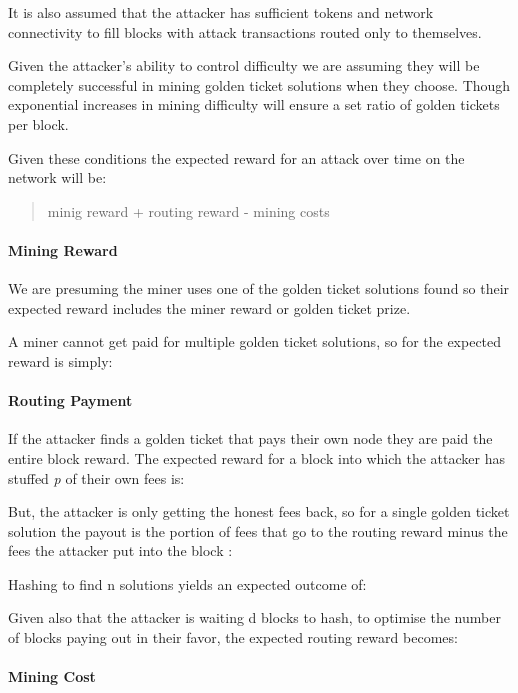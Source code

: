 \documentclass[
]{article}
\begin{document}
It is also assumed that the attacker has sufficient tokens and network
connectivity to fill blocks with attack transactions routed only to
themselves.

Given the attacker's ability to control difficulty we are assuming they
will be completely successful in mining golden ticket solutions when
they choose. Though exponential increases in mining difficulty will
ensure a set ratio of golden tickets per block.

Given these conditions the expected reward for an attack over time on
the network will be:

\begin{quote}
minig reward + routing reward - mining costs
\end{quote}

\hypertarget{mining-reward}{%
\paragraph{Mining Reward}\label{mining-reward}}

We are presuming the miner uses one of the golden ticket solutions found
so their expected reward includes the miner reward or golden ticket
prize.

A miner cannot get paid for multiple golden ticket solutions, so for the
expected reward is simply:

\hypertarget{routing-payment}{%
\paragraph{Routing Payment}\label{routing-payment}}

If the attacker finds a golden ticket that pays their own node they are
paid the entire block reward. The expected reward for a block into which
the attacker has stuffed \emph{p} of their own fees is:

But, the attacker is only getting the honest fees back, so for a single
golden ticket solution the payout is the portion of fees that go to the
routing reward minus the fees the attacker put into the block :

Hashing to find n solutions yields an expected outcome of:

Given also that the attacker is waiting d blocks to hash, to optimise
the number of blocks paying out in their favor, the expected routing
reward becomes:

\hypertarget{mining-cost}{%
\paragraph{Mining Cost}\label{mining-cost}}
\end{document}
